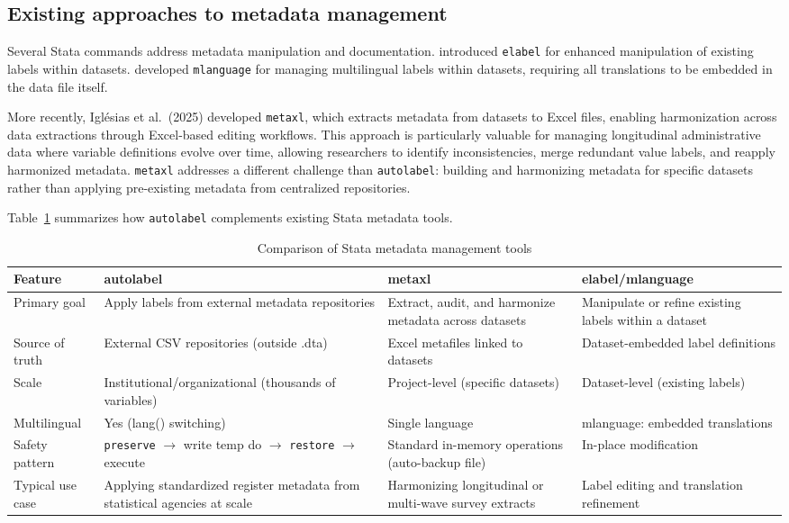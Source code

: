 \subsection{Existing approaches to metadata management}

Several Stata commands address metadata manipulation and documentation. \citet{klein2019elabel} introduced \texttt{elabel} for enhanced manipulation of existing labels within datasets. \citet{weesie2005multilingual} developed \texttt{mlanguage} for managing multilingual labels within datasets, requiring all translations to be embedded in the data file itself.

More recently, Igl\'{e}sias et al.\ (2025) developed \texttt{metaxl}, which extracts metadata from datasets to Excel files, enabling harmonization across data extractions through Excel-based editing workflows. This approach is particularly valuable for managing longitudinal administrative data where variable definitions evolve over time, allowing researchers to identify inconsistencies, merge redundant value labels, and reapply harmonized metadata. \texttt{metaxl} addresses a different challenge than \texttt{autolabel}: building and harmonizing metadata for specific datasets rather than applying pre-existing metadata from centralized repositories.

Table~\ref{tab:comparison} summarizes how \texttt{autolabel} complements existing Stata metadata tools.

\begin{table}[htbp]
\centering
\caption{Comparison of Stata metadata management tools}
\label{tab:comparison}
\small
\begin{tabular}{lp{3.5cm}p{3cm}p{3.5cm}}
\hline
\textbf{Feature} & \textbf{autolabel} & \textbf{metaxl} & \textbf{elabel/mlanguage} \\
\hline
Primary goal & Apply labels from external metadata repositories & Extract, audit, and harmonize metadata across datasets & Manipulate or refine existing labels within a dataset \\[0.3em]
Source of truth & External CSV repositories (outside .dta) & Excel metafiles linked to datasets & Dataset-embedded label definitions \\[0.3em]
Scale & Institutional/organizational (thousands of variables) & Project-level (specific datasets) & Dataset-level (existing labels) \\[0.3em]
Multilingual & Yes (lang() switching) & Single language & mlanguage: embedded translations \\[0.3em]
Safety pattern & \texttt{preserve} $\to$ write temp do $\to$ \texttt{restore} $\to$ execute & Standard in-memory operations (auto-backup file) & In-place modification \\[0.3em]
Typical use case & Applying standardized register metadata from statistical agencies at scale & Harmonizing longitudinal or multi-wave survey extracts & Label editing and translation refinement \\
\hline
\end{tabular}
\end{table}

